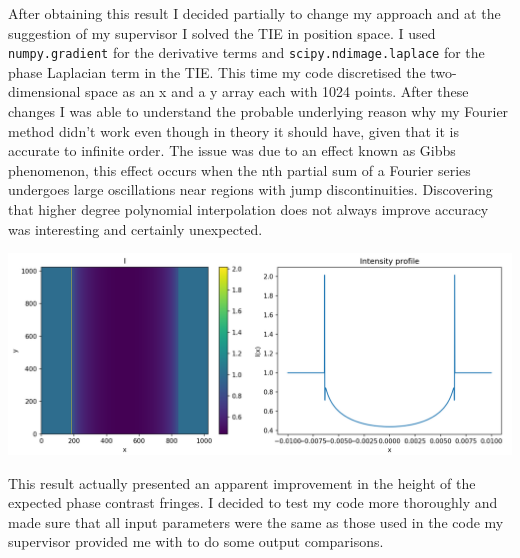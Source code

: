 \documentclass[9pt, a4paper]{article}
\newenvironment{Figure}
    {\par\medskip\noindent\minipage{\linewidth}}
    {\endminipage\par\medskip}
\begin{document}
After obtaining this result I decided partially to change my approach and at the suggestion of my supervisor I solved the TIE in position space. I used \texttt{numpy.gradient} for the derivative terms and \texttt{scipy.ndimage.laplace} for the phase Laplacian term in the TIE. This time my code discretised the two-dimensional space as an x and a y array each with 1024 points. 
After these changes I was able to understand the probable underlying reason why my Fourier method didn't work even though in theory it should have, given that it is accurate to infinite order\cite{Chris}\cite{Fornberg}. The issue was due to an effect known as Gibbs phenomenon, this effect occurs when the nth partial sum of a Fourier series undergoes large oscillations near regions with jump discontinuities\cite{Gibbs}. Discovering that higher degree polynomial interpolation does not always improve accuracy was interesting and certainly unexpected.
\begin{Figure}
\centering
\includegraphics[width=\linewidth]{FD_intensity_profile.pdf}
\end{Figure}
This result actually presented an apparent improvement in the height of the expected phase contrast fringes. I decided to test my code more thoroughly and made sure that all input parameters were the same as those used in the code my supervisor provided me with to do some output comparisons.
\end{document}
